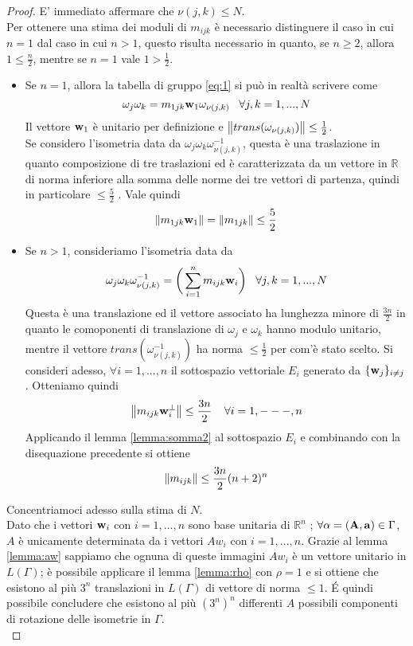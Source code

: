\documentclass[a4paper,11pt,openright,twoside	]{book}
\begin{document}
\begin{proof}
E' immediato affermare che $\nu (j,k) \leq N$. \\
Per ottenere una stima dei moduli di $m_{ijk}$ è necessario distinguere il caso in cui $n = 1$ dal caso in cui $n > 1$, questo risulta necessario in quanto, se $n \geq 2$, allora $1 \leq \frac{n}{2}$, mentre se $n=1$ vale $1 > \frac{1}{2}$. \\
\begin{itemize}
\item Se $n = 1$, allora la tabella di gruppo \ref{eq:1} si può in realtà scrivere come 
\[ \omega_j \omega_k =  m_{1jk} \vb{w}_1 \omega_{\nu (j,k)}      \; \; \; \forall j,k =1, ...,N \]
Il vettore $\vb{w}_1$ è unitario per definizione e $\norm{ trans(\omega_{\nu (j,k)} ) } \leq \frac{1}{2}$. \\
Se considero l'isometria data da $\omega_j \omega_k \omega_{\nu (j,k)}^{-1}$, questa è una traslazione in quanto composizione di tre traslazioni ed è caratterizzata da un vettore in $\mathbb{R}$ di norma inferiore alla somma delle norme dei tre vettori di partenza, quindi in particolare
$\leq \frac{5}{2}$ . Vale quindi 
\[ \norm{m_{1jk} \vb{w}_1 } =  \norm{m_{1jk}} \leq \frac{5}{2} \] 
\item Se $n>1$, consideriamo l'isometria data da 
\[  \omega_j \omega_k \omega^{-1}_{\nu (j,k)} = \bigg( \sum_{i = 1}^{n} m_{ijk} \vb{w}_i\bigg)      \; \; \; \forall j,k =1, ...,N \]
Questa è una translazione ed il vettore associato ha lunghezza minore di $ \frac{3n}{2}$ in quanto le comoponenti di translazione di $\omega_j$ e $  \omega_k $  hanno modulo unitario, mentre il vettore $trans(\omega^{-1}_{\nu (j,k)}) $ ha norma $\leq \frac{1}{2}$  per com'è stato scelto. 
Si consideri adesso, $\forall i = 1,...,n$ il sottospazio vettoriale $E_i$ generato da $ \{ \vb{w}_j \}_{i \neq j}$. Otteniamo quindi 
\begin{equation}
\label{eq:mijk}
\norm{m_{ijk} \vb{w}_i^{\perp}}  \leq \frac{3n}{2} \; \; \; \; \forall i = 1, ---, n
\end{equation}
Applicando il lemma \ref{lemma:somma2} al sottospazio $E_i$ e combinando con la disequazione precedente si ottiene 
\begin{equation}
\norm{m_{ijk} } \leq \frac{3n}{2} (n+2)^{n}
\end{equation}
\end{itemize}
Concentriamoci adesso sulla stima di $N$. \\
Dato che i vettori $\vb{w}_i $ con $i=1,...,n$ sono base unitaria di $\mathbb{R}^n$ ;  $ \forall \alpha  = (\vb{A,a}) \in \Gamma$, $A$ è unicamente determinata da i vettori $Aw_i$ con $i=1,...,n$. Grazie al lemma \ref{lemma:aw} sappiamo che ognuna di queste immagini $Aw_i$ è un vettore unitario in $L(\Gamma)$; è possibile applicare il lemma \ref{lemma:rho} con $\rho = 1$ e si ottiene  che esistono al più $3^n$ translazioni in $L(\Gamma)$ di vettore di norma $\leq 1$. \'E quindi possibile concludere che esistono al più $(3^n)^n$ differenti $A$ possibili componenti di rotazione delle isometrie in $\Gamma$. \\

\end{proof}
\end{document}
